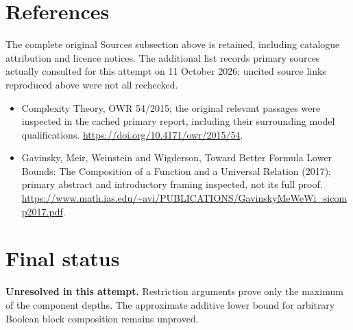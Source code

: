 \documentclass[11pt]{article}
\begin{document}
\section{References}
The complete original Sources subsection above is retained, including catalogue attribution and licence notices. The additional list records primary sources actually consulted for this attempt on 11 October 2026; uncited source links reproduced above were not all rechecked.
\begin{itemize}
\item Complexity Theory, OWR 54/2015; the original relevant passages were inspected in the cached primary report, including their surrounding model qualifications. \url{https://doi.org/10.4171/owr/2015/54}.
\item Gavinsky, Meir, Weinstein and Wigderson, Toward Better Formula Lower Bounds: The Composition of a Function and a Universal Relation (2017); primary abstract and introductory framing inspected, not its full proof. \url{https://www.math.ias.edu/~avi/PUBLICATIONS/GavinskyMeWeWi_sicomp2017.pdf}.
\end{itemize}
\section{Final status}
\textbf{Unresolved in this attempt.} Restriction arguments prove only the maximum of the component depths. The approximate additive lower bound for arbitrary Boolean block composition remains unproved.
\end{document}
